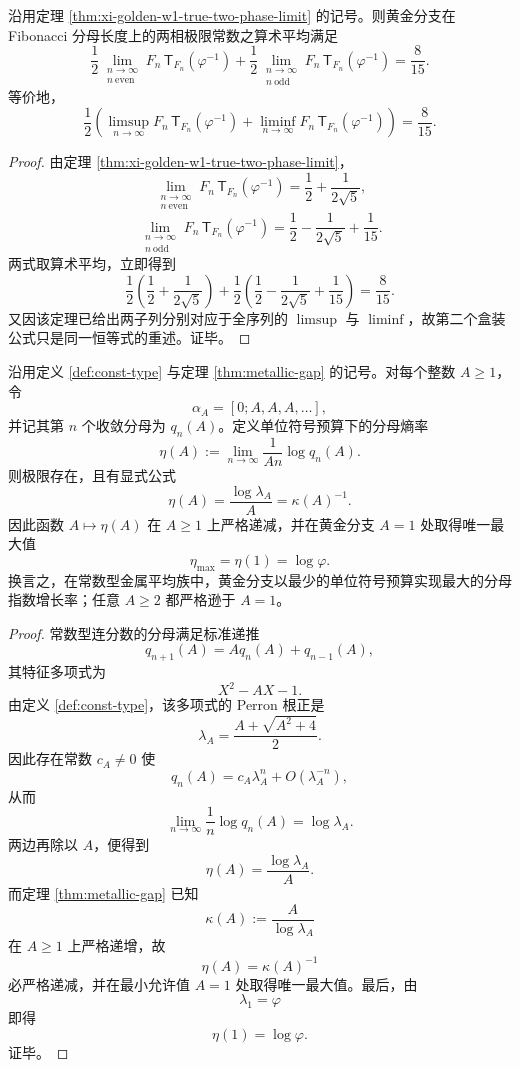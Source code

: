 \begin{corollary}\label{cor:xi-golden-w1-two-phase-arithmetic-mean-eight-fifteenths}
沿用定理 \ref{thm:xi-golden-w1-true-two-phase-limit} 的记号。则黄金分支在 Fibonacci 分母长度上的两相极限常数之算术平均满足
\[
\boxed{\;
\frac12\lim_{\substack{n\to\infty\\ n\ \mathrm{even}}}
F_n\,\mathsf{T}_{F_n}(\varphi^{-1})
+
\frac12\lim_{\substack{n\to\infty\\ n\ \mathrm{odd}}}
F_n\,\mathsf{T}_{F_n}(\varphi^{-1})
=
\frac{8}{15}.\;}
\]
等价地，
\[
\boxed{\;
\frac12\left(\limsup_{n\to\infty}F_n\,\mathsf{T}_{F_n}(\varphi^{-1})
+
\liminf_{n\to\infty}F_n\,\mathsf{T}_{F_n}(\varphi^{-1})\right)
=
\frac{8}{15}.\;}
\]
\end{corollary}
\begin{proof}
由定理 \ref{thm:xi-golden-w1-true-two-phase-limit}，
\[
\lim_{\substack{n\to\infty\\ n\ \mathrm{even}}}
F_n\,\mathsf{T}_{F_n}(\varphi^{-1})
=
\frac12+\frac{1}{2\sqrt5},
\]
\[
\lim_{\substack{n\to\infty\\ n\ \mathrm{odd}}}
F_n\,\mathsf{T}_{F_n}(\varphi^{-1})
=
\frac12-\frac{1}{2\sqrt5}+\frac1{15}.
\]
两式取算术平均，立即得到
\[
\frac12\left(\frac12+\frac{1}{2\sqrt5}\right)
+
\frac12\left(\frac12-\frac{1}{2\sqrt5}+\frac1{15}\right)
=
\frac{8}{15}.
\]
又因该定理已给出两子列分别对应于全序列的 \(\limsup\) 与 \(\liminf\)，故第二个盒装公式只是同一恒等式的重述。证毕。
\end{proof}

\begin{theorem}[黄金分支在金属平均族中唯一最大化单位符号预算下的分母熵率]\label{thm:xi-golden-metallic-symbol-budget-entropy-optimality}
沿用定义 \ref{def:const-type} 与定理 \ref{thm:metallic-gap} 的记号。对每个整数 \(A\ge 1\)，令
\[
\alpha_A=[0;A,A,A,\dots],
\]
并记其第 \(n\) 个收敛分母为 \(q_n(A)\)。定义单位符号预算下的分母熵率
\[
\eta(A):=
\lim_{n\to\infty}\frac{1}{An}\log q_n(A).
\]
则极限存在，且有显式公式
\[
\boxed{\;
\eta(A)=\frac{\log\lambda_A}{A}=\kappa(A)^{-1}.\;}
\]
因此函数 \(A\mapsto \eta(A)\) 在 \(A\ge 1\) 上严格递减，并在黄金分支 \(A=1\) 处取得唯一最大值
\[
\boxed{\;
\eta_{\max}=\eta(1)=\log\varphi.\;}
\]
换言之，在常数型金属平均族中，黄金分支以最少的单位符号预算实现最大的分母指数增长率；任意 \(A\ge 2\) 都严格逊于 \(A=1\)。
\end{theorem}
\begin{proof}
常数型连分数的分母满足标准递推
\[
q_{n+1}(A)=Aq_n(A)+q_{n-1}(A),
\]
其特征多项式为
\[
X^2-AX-1.
\]
由定义 \ref{def:const-type}，该多项式的 Perron 根正是
\[
\lambda_A=\frac{A+\sqrt{A^2+4}}{2}.
\]
因此存在常数 \(c_A\neq 0\) 使
\[
q_n(A)=c_A\lambda_A^n+O(\lambda_A^{-n}),
\]
从而
\[
\lim_{n\to\infty}\frac{1}{n}\log q_n(A)=\log\lambda_A.
\]
两边再除以 \(A\)，便得到
\[
\eta(A)=\frac{\log\lambda_A}{A}.
\]
而定理 \ref{thm:metallic-gap} 已知
\[
\kappa(A):=\frac{A}{\log\lambda_A}
\]
在 \(A\ge 1\) 上严格递增，故
\[
\eta(A)=\kappa(A)^{-1}
\]
必严格递减，并在最小允许值 \(A=1\) 处取得唯一最大值。最后，由
\[
\lambda_1=\varphi
\]
即得
\[
\eta(1)=\log\varphi.
\]
证毕。
\end{proof}

\endinput
